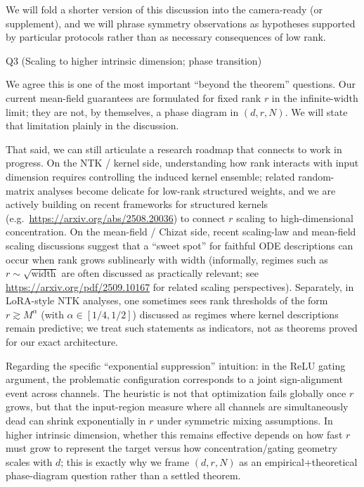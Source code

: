 We will fold a shorter version of this discussion into the camera-ready (or supplement), and we will phrase symmetry observations as hypotheses supported by particular protocols rather than as necessary consequences of low rank.

Q3 (Scaling to higher intrinsic dimension; phase transition)

We agree this is one of the most important ``beyond the theorem'' questions. Our current mean-field guarantees are formulated for fixed rank $r$ in the infinite-width limit; they are not, by themselves, a phase diagram in $(d,r,N)$. We will state that limitation plainly in the discussion.

That said, we can still articulate a research roadmap that connects to work in progress. On the NTK / kernel side, understanding how rank interacts with input dimension requires controlling the induced kernel ensemble; related random-matrix analyses become delicate for low-rank structured weights, and we are actively building on recent frameworks for structured kernels (e.g.\ \url{https://arxiv.org/abs/2508.20036}) to connect $r$ scaling to high-dimensional concentration. On the mean-field / Chizat side, recent scaling-law and mean-field scaling discussions suggest that a ``sweet spot'' for faithful ODE descriptions can occur when rank grows sublinearly with width (informally, regimes such as $r\sim\sqrt{\mathrm{width}}$ are often discussed as practically relevant; see \url{https://arxiv.org/pdf/2509.10167} for related scaling perspectives). Separately, in LoRA-style NTK analyses, one sometimes sees rank thresholds of the form $r\gtrsim M^{\alpha}$ (with $\alpha\in[1/4,1/2]$) discussed as regimes where kernel descriptions remain predictive; we treat such statements as indicators, not as theorems proved for our exact architecture.

Regarding the specific ``exponential suppression'' intuition: in the ReLU gating argument, the problematic configuration corresponds to a joint sign-alignment event across channels. The heuristic is not that optimization fails globally once $r$ grows, but that the input-region measure where all channels are simultaneously dead can shrink exponentially in $r$ under symmetric mixing assumptions. In higher intrinsic dimension, whether this remains effective depends on how fast $r$ must grow to represent the target versus how concentration/gating geometry scales with $d$; this is exactly why we frame $(d,r,N)$ as an empirical+theoretical phase-diagram question rather than a settled theorem.


